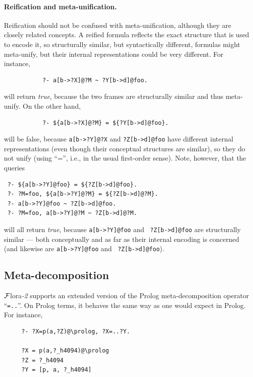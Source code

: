 \documentclass[11pt]{article}
\newcommand{\FLORA}{{\mbox{\sc ${\cal F}${lora}\rm\emph{-2}}}\xspace}
\newcommand{\FLSYSTEM}{\FLORA}
\begin{document}
\paragraph{Reification and meta-unification.}
Reification should not be confused with meta-unification, although they are
closely related concepts. A reified formula reflects the exact structure that is used
to encode it, so structurally similar, but syntactically different, formulas
might meta-unify, but their internal representations could be very different.
For instance, 
\begin{verbatim}
           ?- a[b->?X]@?M ~ ?Y[b->d]@foo.
\end{verbatim}
will return \emph{true}, because the two frames are structurally similar
and thus meta-unify. On the other hand,
\begin{verbatim}
           ?- ${a[b->?X]@?M} = ${?Y[b->d]@foo}.
\end{verbatim}
will be false, because {\tt a[b->?Y]@?X} and {\tt ?Z[b->d]@foo} have different
internal representations (even though their conceptual structures are
similar), so they do not unify (using ``='', i.e., in the usual
first-order sense). Note, however, that the queries
\begin{verbatim}
 ?- ${a[b->?Y]@foo} = ${?Z[b->d]@foo}.
 ?- ?M=foo, ${a[b->?Y]@?M} = ${?Z[b->d]@?M}.
 ?- a[b->?Y]@foo ~ ?Z[b->d]@foo.
 ?- ?M=foo, a[b->?Y]@?M ~ ?Z[b->d]@?M.
\end{verbatim}
will all return \emph{true}, because {\tt a[b->?Y]@foo} and {\tt
  ?Z[b->d]@foo} are structurally similar --- both conceptually and as far as
  their
internal encoding is concerned (and likewise are {\tt a[b->?Y]@foo} and {\tt
  ?Z[b->d]@foo}).

\subsection{Meta-decomposition}\label{sec-meta-decomp}

\FLSYSTEM supports an extended version of the Prolog meta-decomposition
operator ``{\tt =..}''. On Prolog terms, it behaves the same way as one
would expect in Prolog. For instance, 
\begin{verbatim}
     ?- ?X=p(a,?Z)@\prolog, ?X=..?Y.
 
     ?X = p(a,?_h4094)@\prolog
     ?Z = ?_h4094
     ?Y = [p, a, ?_h4094]
\end{verbatim}
\end{document}
